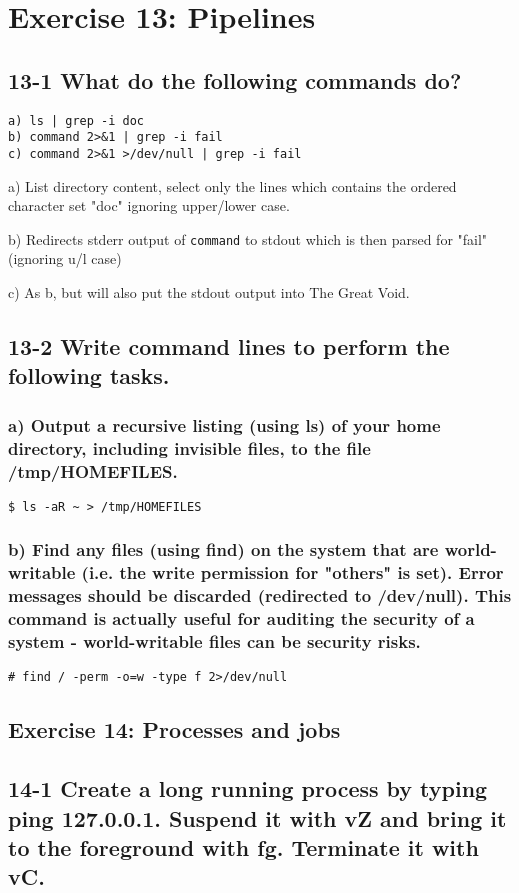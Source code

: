\section{Exercise 13: Pipelines}
\subsection{13-1 What do the following commands do?}
\begin{verbatim}
a) ls | grep -i doc
b) command 2>&1 | grep -i fail
c) command 2>&1 >/dev/null | grep -i fail
\end{verbatim}
a) List directory content, select only the lines which contains the ordered character set "doc" ignoring upper/lower case.

b) Redirects stderr output of \verb=command= to stdout which is then parsed for "fail" (ignoring u/l case)

c) As b, but will also put the stdout output into The Great Void.
\subsection{13-2 Write command lines to perform the following tasks.}
\subsubsection{a) Output a recursive listing (using ls) of your home directory, including invisible files, to the file /tmp/HOMEFILES.}
\verb=$ ls -aR ~ > /tmp/HOMEFILES=

\subsubsection{b) Find any files (using find) on the system that are world-writable (i.e. the write permission for "others" is set). Error messages should be discarded (redirected to /dev/null). This command is actually useful for auditing the security of a system - world-writable files can be security risks.}
\verb?# find / -perm -o=w -type f 2>/dev/null?


\subsection{Exercise 14: Processes and jobs}
\subsection{14-1 Create a long running process by typing ping 127.0.0.1. Suspend it with vZ and bring it to the foreground with fg. Terminate it with vC.}

